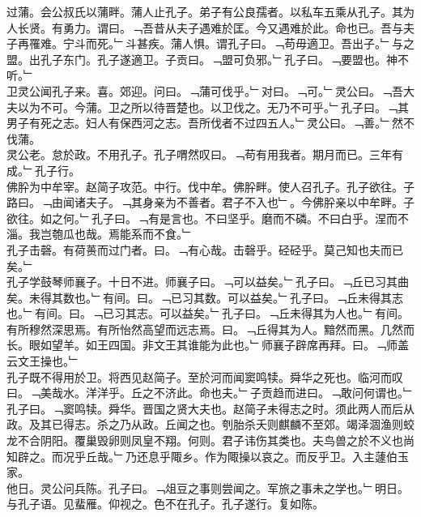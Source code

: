 \documentclass{zhvt-classic}
\begin{document}
\hspace*{2em}过蒲。会公叔氏以蒲畔。蒲人止孔子。弟子有公良孺者。以私车五乘从孔子。其为人长贤。有勇力。谓曰。﹁吾昔从夫子遇难於匡。今又遇难於此。命也已。吾与夫子再罹难。宁斗而死。﹂斗甚疾。蒲人惧。谓孔子曰。﹁苟毋適卫。吾出子。﹂与之盟。出孔子东门。孔子遂適卫。子贡曰。﹁盟可负邪。﹂孔子曰。﹁要盟也。神不听。﹂\\
\hspace*{2em}卫灵公闻孔子来。喜。郊迎。问曰。﹁蒲可伐乎。﹂对曰。﹁可。﹂灵公曰。﹁吾大夫以为不可。今蒲。卫之所以待晋楚也。以卫伐之。无乃不可乎。﹂孔子曰。﹁其男子有死之志。妇人有保西河之志。吾所伐者不过四五人。﹂灵公曰。﹁善。﹂然不伐蒲。\\
\hspace*{2em}灵公老。怠於政。不用孔子。孔子喟然叹曰。﹁苟有用我者。期月而已。三年有成。﹂孔子行。\\
\hspace*{2em}佛肸为中牟宰。赵简子攻范。中行。伐中牟。佛肸畔。使人召孔子。孔子欲往。子路曰。﹁由闻诸夫子。﹁其身亲为不善者。君子不入也﹂。今佛肸亲以中牟畔。子欲往。如之何。﹂孔子曰。﹁有是言也。不曰坚乎。磨而不磷。不曰白乎。涅而不淄。我岂匏瓜也哉。焉能系而不食。﹂\\
\hspace*{2em}孔子击磬。有荷蒉而过门者。曰。﹁有心哉。击磬乎。硁硁乎。莫己知也夫而已矣。﹂\\
\hspace*{2em}孔子学鼓琴师襄子。十日不进。师襄子曰。﹁可以益矣。﹂孔子曰。﹁丘已习其曲矣。未得其数也。﹂有间。曰。﹁已习其数。可以益矣。﹂孔子曰。﹁丘未得其志也。﹂有间。曰。﹁已习其志。可以益矣。﹂孔子曰。﹁丘未得其为人也。﹂有间。有所穆然深思焉。有所怡然高望而远志焉。曰。﹁丘得其为人。黯然而黑。几然而长。眼如望羊。如王四国。非文王其谁能为此也。﹂师襄子辟席再拜。曰。﹁师盖云文王操也。﹂\\
\hspace*{2em}孔子既不得用於卫。将西见赵简子。至於河而闻窦鸣犊。舜华之死也。临河而叹曰。﹁美哉水。洋洋乎。丘之不济此。命也夫。﹂子贡趋而进曰。﹁敢问何谓也。﹂孔子曰。﹁窦鸣犊。舜华。晋国之贤大夫也。赵简子未得志之时。须此两人而后从政。及其已得志。杀之乃从政。丘闻之也。刳胎杀夭则麒麟不至郊。竭泽涸渔则蛟龙不合阴阳。覆巢毁卵则凤皇不翔。何则。君子讳伤其类也。夫鸟兽之於不义也尚知辟之。而况乎丘哉。﹂乃还息乎陬乡。作为陬操以哀之。而反乎卫。入主蘧伯玉家。\\
\hspace*{2em}他日。灵公问兵陈。孔子曰。﹁俎豆之事则尝闻之。军旅之事未之学也。﹂明日。与孔子语。见蜚雁。仰视之。色不在孔子。孔子遂行。复如陈。\\
\end{document}
